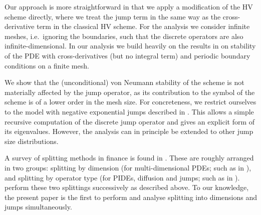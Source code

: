 Our approach is more straightforward in that we apply a modification of the HV scheme directly, where we treat the jump term in the same way as the cross-derivative term in the classical HV scheme.
For the analysis we consider infinite meshes, i.e.\ ignoring the boundaries,
such that the discrete operators are also infinite-dimensional.
In our analysis we build heavily on the results in \cite{intHoutStability} on stability of the PDE with cross-derivatives (but no integral term) and periodic boundary conditions on a finite mesh.

We show that the (unconditional) von Neumann stability of the scheme is not materially affected by the jump operator, as its contribution to the symbol of the scheme is of a lower order in the mesh size.
For concreteness, we restrict ourselves to the model with negative exponential jumps described in \cite{Lipton2015}.
This allows a simple recursive computation of the discrete jump operator and gives an explicit form of its eigenvalues. However, the analysis can in principle be extended to other jump size distributions.


A survey of splitting methods in finance is found in \cite{toivanen2015application}. These are roughly arranged in two groups: splitting by dimension (for multi-dimensional PDEs; such as in \cite{intHoutStability}), and splitting by operator type 
(for PIDEs, diffusion and jumps; such as in \cite{andersen2000jump}). 
\cite{LiptonItkin2014} perform these two splittings successively as described above.
To our knowledge, the present paper is the first to perform and analyse splitting into dimensions and jumps simultaneously.


